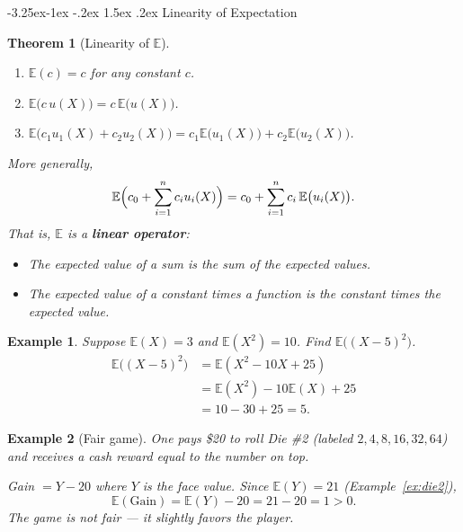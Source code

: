 \documentclass{article}
\makeatletter
\newtheorem{theorem}{Theorem}[section]
\newtheorem{example}{Example}[section]
\theoremstyle{remark}
\newlength{\subsecindent}
\renewcommand\subsection{\@startsection{subsection}{2}{\subsecindent}%
  {-3.25ex\@plus -1ex \@minus -.2ex}%
  {1.5ex \@plus .2ex}%
  {\normalfont\large\bfseries}}
\newenvironment{sub}{%
  \begin{list}{}{%
    \setlength{\leftmargin}{4em}%
    \setlength{\rightmargin}{0pt}%
    \setlength{\topsep}{0pt}%
    \setlength{\partopsep}{0pt}%
    \setlength{\parsep}{\parskip}%
    \setlength{\itemsep}{\parskip}%
  }\item\relax
}{\end{list}}
\newcommand{\E}{\mathbb{E}}
\makeatother
\begin{document}
\subsection{Linearity of Expectation}
\begin{sub}

\begin{theorem}[Linearity of $\E$]
  \label{thm:linearity}
  \leavevmode
  \begin{enumerate}
    \item $\E(c) = c$ for any constant $c$.
    \item $\E\bigl(c \, u(X)\bigr) = c \, \E\bigl(u(X)\bigr)$.
    \item $\E\bigl(c_1 u_1(X) + c_2 u_2(X)\bigr) = c_1 \E\bigl(u_1(X)\bigr) + c_2 \E\bigl(u_2(X)\bigr)$.
  \end{enumerate}
  More generally,
  \begin{equation}
    \E\Bigl(c_0 + \sum_{i=1}^{n} c_i u_i(X)\Bigr) = c_0 + \sum_{i=1}^{n} c_i \, \E\bigl(u_i(X)\bigr).
    \label{eq:linearity}
  \end{equation}
  That is, $\E$ is a \textbf{linear operator}:
  \begin{itemize}
    \item The expected value of a sum is the sum of the expected values.
    \item The expected value of a constant times a function is the constant times the expected value.
  \end{itemize}
\end{theorem}

\begin{example}
  \label{ex:linearity}
  Suppose $\E(X) = 3$ and $\E(X^2) = 10$. Find $\E\bigl((X-5)^2\bigr)$.
  \begin{align*}
    \E\bigl((X-5)^2\bigr)
      &= \E(X^2 - 10X + 25) \\
      &= \E(X^2) - 10\E(X) + 25 \\
      &= 10 - 30 + 25 = 5.
  \end{align*}
\end{example}

\begin{example}[Fair game]
  \label{ex:fair-game}
  One pays \$20 to roll Die \#2 (labeled $2, 4, 8, 16, 32, 64$) and receives a cash reward equal to the number on top.

  Gain $= Y - 20$ where $Y$ is the face value. Since $\E(Y) = 21$ (Example~\ref{ex:die2}),
  \[
    \E(\text{Gain}) = \E(Y) - 20 = 21 - 20 = 1 > 0.
  \]
  The game is \emph{not} fair --- it slightly favors the player.
\end{example}

\end{sub}
\end{document}
